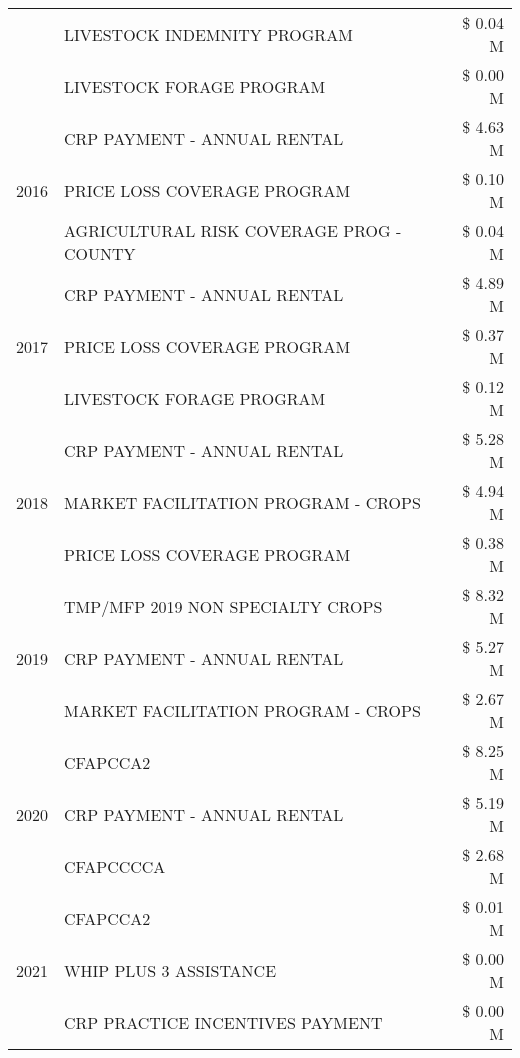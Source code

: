 \begin{tabular}{llr}
 & LIVESTOCK INDEMNITY PROGRAM & \$ 0.04 M \\
 & LIVESTOCK FORAGE PROGRAM & \$ 0.00 M \\
\cline{1-3}
\multirow[t]{3}{*}{2016} & CRP PAYMENT - ANNUAL RENTAL & \$ 4.63 M \\
 & PRICE LOSS COVERAGE PROGRAM & \$ 0.10 M \\
 & AGRICULTURAL RISK COVERAGE PROG - COUNTY & \$ 0.04 M \\
\cline{1-3}
\multirow[t]{3}{*}{2017} & CRP PAYMENT - ANNUAL RENTAL & \$ 4.89 M \\
 & PRICE LOSS COVERAGE PROGRAM & \$ 0.37 M \\
 & LIVESTOCK FORAGE PROGRAM & \$ 0.12 M \\
\cline{1-3}
\multirow[t]{3}{*}{2018} & CRP PAYMENT - ANNUAL RENTAL & \$ 5.28 M \\
 & MARKET FACILITATION PROGRAM - CROPS & \$ 4.94 M \\
 & PRICE LOSS COVERAGE PROGRAM & \$ 0.38 M \\
\cline{1-3}
\multirow[t]{3}{*}{2019} & TMP/MFP 2019 NON SPECIALTY CROPS & \$ 8.32 M \\
 & CRP PAYMENT - ANNUAL RENTAL & \$ 5.27 M \\
 & MARKET FACILITATION PROGRAM - CROPS & \$ 2.67 M \\
\cline{1-3}
\multirow[t]{3}{*}{2020} & CFAPCCA2 & \$ 8.25 M \\
 & CRP PAYMENT - ANNUAL RENTAL & \$ 5.19 M \\
 & CFAPCCCCA & \$ 2.68 M \\
\cline{1-3}
\multirow[t]{3}{*}{2021} & CFAPCCA2 & \$ 0.01 M \\
 & WHIP PLUS 3 ASSISTANCE & \$ 0.00 M \\
 & CRP PRACTICE INCENTIVES PAYMENT & \$ 0.00 M \\
\cline{1-3}
\bottomrule
\end{tabular}

